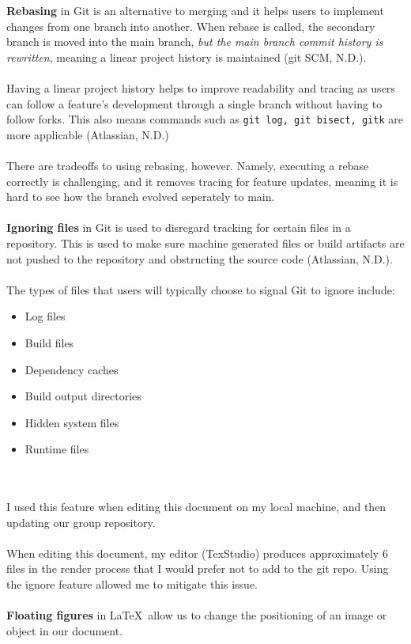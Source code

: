 \documentclass[a4paper, 11pt]{report}
\begin{document}
	\textbf{Rebasing} in Git is an alternative to merging and it helps users to implement changes from one branch into another. When rebase is called, the secondary branch is moved into the main branch, \textit{but the main branch commit history is rewritten}, meaning a linear project history is maintained (git SCM, N.D.).
	\\
	\\Having a linear project history helps to improve readability and tracing as users can follow a feature's development through a single branch without having to follow forks. This also means commands such as \texttt{git log, git bisect, gitk} are more applicable (Atlassian, N.D.)
	\\
	\\There are tradeoffs to using rebasing, however. Namely, executing a rebase correctly is challenging, and it removes tracing for feature updates, meaning it is hard to see how the branch evolved seperately to main.
	\\
	\\
	\textbf{Ignoring files} in Git is used to disregard tracking for certain files in a repository. This is used to make sure machine generated files or build artifacts are not pushed to the repository and obstructing the source code (Atlassian, N.D.).
	\\
	\\The types of files that users will typically choose to signal Git to ignore include:
	\begin{itemize}
	    \item Log files
	    \item Build files
	    \item Dependency caches
	    \item Build output directories
	    \item Hidden system files
	    \item Runtime files
	\end{itemize}
	\\
	\\I used this feature when editing this document on my local machine, and then updating our group repository.
	\\
	\\When editing this document, my editor (TexStudio) produces approximately 6 files in the render process that I would prefer not to add to the git repo. Using the ignore feature allowed me to mitigate this issue.
	\\
	\\
	\textbf{Floating figures} in \LaTeX\ allow us to change the positioning of an image or object in our document.
\end{document}
